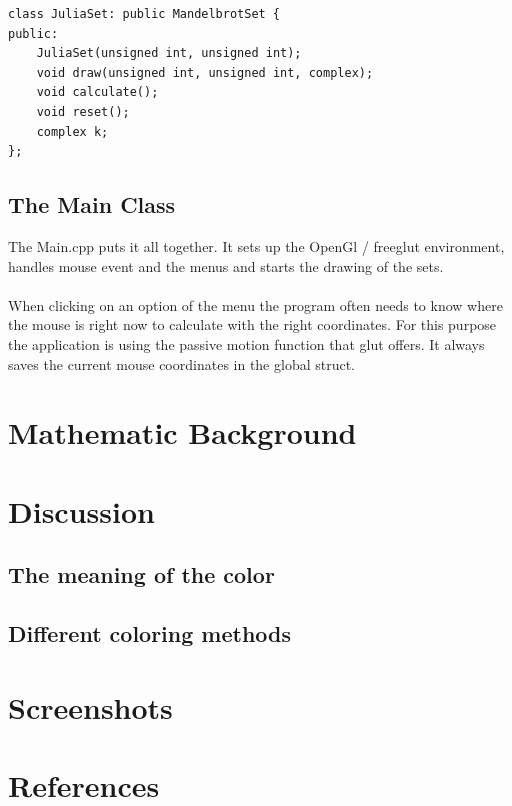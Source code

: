 \documentclass[final, paper=a4, paper=portrait, pagesize=auto, fontsize=10pt,english]{scrartcl}
\begin{document}
\begin{lstlisting}
class JuliaSet: public MandelbrotSet {
public:
	JuliaSet(unsigned int, unsigned int);
	void draw(unsigned int, unsigned int, complex);
	void calculate();
	void reset();
	complex k;
};
\end{lstlisting}

\subsection{The Main Class} 	
The Main.cpp puts it all together. It sets up the OpenGl / freeglut environment, handles mouse event and the menus and starts the drawing of the sets. \\\\
When clicking on an option of the menu the program often needs to know where the mouse is right now to calculate with the right coordinates. For this purpose the application is using the passive motion function that glut offers. It always saves the current mouse coordinates in the global struct.

\section{Mathematic Background}
\section{Discussion}
\subsection{The meaning of the color}


\subsection{Different coloring methods}

\section{Screenshots}
\section{References}
\end{document}
